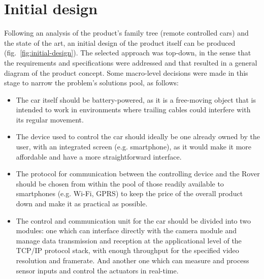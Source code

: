 \section{Initial design}%
\label{sec:org68fdd80}

Following an analysis of the product’s family tree (remote controlled cars) and the state of the art, an initial design of the product itself can be produced (fig.~\ref{fig:initial-design}).
The selected approach was top-down, in the sense that the requirements and specifications were addressed and that resulted in a general diagram of the product concept. Some macro-level decisions were made in this stage to narrow the problem’s solutions pool, as follows:

\begin{itemize}
\item  The car itself should be battery-powered, as it is a free-moving object that is intended to work in environments where trailing cables could interfere with its regular movement.

\item The device used to control the car should ideally be one already owned by the user, with an integrated screen (e.g. smartphone), as it would make it more affordable and have a more straightforward interface.

\item The protocol for communication between the controlling device and the Rover should be chosen from within the pool of those readily available to smartphones (e.g. Wi-Fi, GPRS) to keep the price of the overall product down and make it as practical as possible.

\item  The control and communication unit for the car should be divided into two modules: one which can interface directly with the camera module and manage data transmission and reception at the applicational level of the TCP/IP protocol stack, with enough throughput for the specified video resolution and framerate. And another one which can measure and process sensor inputs and control the actuators in real-time.

\end{itemize}


